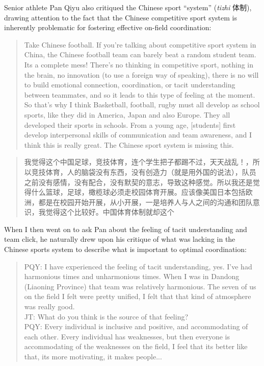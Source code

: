 \begin{CJK}{UTF8}{gbsn}
Senior athlete Pan Qiyu also critiqued the Chinese sport ``system'' (\textit{tizhi} 体制), drawing attention to the fact that the Chinese competitive sport system is inherently problematic for fostering effective on-field coordination:

\begin{quote}
  Take Chinese football.  If you’re talking about competitive sport system in China, the Chinese football team can barely beat a random student team. Its a complete mess! There’s no thinking in competitive sport, nothing in the brain, no innovation (to use a foreign way of speaking), there is no will to build emotional connection, coordination, or tacit understanding between teammates, and so it leads to this type of feeling at the moment.  So that's why I think Basketball, football, rugby must all develop as school sports, like they did in America, Japan and also Europe. They all developed their sports in schools. From a young age, [students] first develop interpersonal skills of communication and team awareness, and I think this is really great.  The Chinese sport system is missing this.
\end{quote}

\begin{quote}
  我觉得这个中国足球，竞技体育，连个学生把子都踢不过，天天战乱！，所以竞技体育，人的脑袋没有东西，没有创造力（就是用外国的说法），队员之前没有感情，没有配合，没有默契的意志，导致这种感觉。所以我还是觉得什么篮球，足球，橄榄球必须走校园体育开展。应该像美国日本包括欧洲，都是在校园开始开展，从小开展，一是培养人与人之间的沟通和团队意识，我觉得这个比较好。中国体育体制就却这个
\end{quote}

When I then went on to ask Pan about the feeling of tacit understanding and team click, he naturally drew upon his critique of what was lacking in the Chinese sports system to describe what is important to optimal coordination:

  \begin{quote}
    PQY: I have experienced the feeling of tacit understanding, yes. I've had harmonious times and unharmonious times. When I was in Dandong (Liaoning Province) that team was relatively harmonious.  The seven of us on the field I felt were pretty unified, I felt that that kind of atmosphere was really good. \\
    JT: What do you think is the source of that feeling? \\
    PQY: Every individual is inclusive and positive, and accommodating of each other. Every individual has weaknesses, but then everyone is accommodating of the weaknesses on the field, I feel that its better like that, its more motivating, it makes people...
  \end{quote}


\end{CJK}
